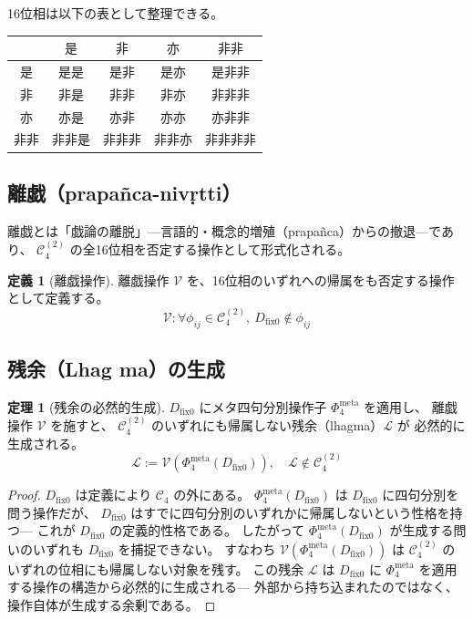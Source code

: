\documentclass[11pt,a4paper]{article}
\theoremstyle{definition}
\newtheorem{definition}{定義}[section]
\newtheorem{theorem}{定理}[section]
\newcommand{\dfix}{D_{\mathrm{fix}0}}
\newcommand{\phiS}{\text{是}}
\newcommand{\phiN}{\text{非}}
\newcommand{\phiSN}{\text{亦}}
\newcommand{\phiNS}{\text{非非}}
\newcommand{\Phimeta}{\Phi_{4}^{\mathrm{meta}}}
\begin{document}
16位相は以下の表として整理できる。

\begin{center}
\begin{tabular}{c|cccc}
& $\phiS$ & $\phiN$ & $\phiSN$ & $\phiNS$ \\
\hline
$\phiS$ & 是是 & 是非 & 是亦 & 是非非 \\
$\phiN$ & 非是 & 非非 & 非亦 & 非非非 \\
$\phiSN$ & 亦是 & 亦非 & 亦亦 & 亦非非 \\
$\phiNS$ & 非非是 & 非非非 & 非非亦 & 非非非非 \\
\end{tabular}
\end{center}

\subsection{離戯（prapañca-nivṛtti）}

離戯とは「戯論の離脱」---言語的・概念的増殖（prapañca）からの撤退---であり、
$\mathcal{C}_4^{(2)}$ の全16位相を否定する操作として形式化される。

\begin{definition}[離戯操作]
離戯操作 $\mathcal{V}$ を、16位相のいずれへの帰属をも否定する操作として定義する。
\begin{equation}
\mathcal{V} : \forall \phi_{ij} \in \mathcal{C}_4^{(2)},\ 
\dfix \notin \phi_{ij}
\end{equation}
\end{definition}

\subsection{残余（Lhag ma）の生成}

\begin{theorem}[残余の必然的生成]
$\dfix$ にメタ四句分別操作子 $\Phimeta$ を適用し、
離戯操作 $\mathcal{V}$ を施すと、
$\mathcal{C}_4^{(2)}$ のいずれにも帰属しない残余（lhagma）$\mathcal{L}$ が
必然的に生成される。
\begin{equation}
\mathcal{L} := \mathcal{V}(\Phimeta(\dfix)),\quad
\mathcal{L} \notin \mathcal{C}_4^{(2)}
\end{equation}
\end{theorem}

\begin{proof}
$\dfix$ は定義により $\mathcal{C}_4$ の外にある。
$\Phimeta(\dfix)$ は $\dfix$ に四句分別を問う操作だが、
$\dfix$ はすでに四句分別のいずれかに帰属しないという性格を持つ---
これが $\dfix$ の定義的性格である。
したがって $\Phimeta(\dfix)$ が生成する問いのいずれも
$\dfix$ を捕捉できない。
すなわち $\mathcal{V}(\Phimeta(\dfix))$ は
$\mathcal{C}_4^{(2)}$ のいずれの位相にも帰属しない対象を残す。
この残余 $\mathcal{L}$ は
$\dfix$ に $\Phimeta$ を適用する操作の構造から必然的に生成される---
外部から持ち込まれたのではなく、操作自体が生成する余剰である。
\end{proof}
\end{document}
